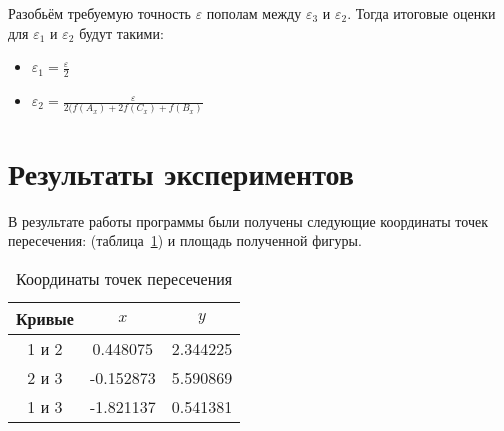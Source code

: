 \documentclass[a4paper,12pt,titlepage,finall]{article}
\begin{document}
Разобьём требуемую точность $\varepsilon$ пополам между $\varepsilon_3$ и $\varepsilon_2$. Тогда итоговые оценки для $\varepsilon_1$ и $\varepsilon_2$ будут такими:
\begin{itemize}
  \item $\varepsilon_1 = \frac{\varepsilon}{2}$

  \item $\varepsilon_2 = \frac{\varepsilon}{2(f(A_x) + 2f({C_x}) + f({B_x})}$
\end{itemize}

\newpage

\section{Результаты экспериментов}

В результате работы программы были получены следующие координаты точек пересечения: (таблица~\ref{table1}) и площадь полученной фигуры.

\begin{table}[h]
\centering
\begin{tabular}{|c|c|c|}
\hline
Кривые & $x$ & $y$ \\
\hline
1 и 2 &  0.448075 & 2.344225 \\
2 и 3 &  -0.152873 & 5.590869 \\
1 и 3 & -1.821137 & 0.541381 \\
\hline
\end{tabular}
\caption{Координаты точек пересечения}
\label{table1}
\end{table}
\end{document}
